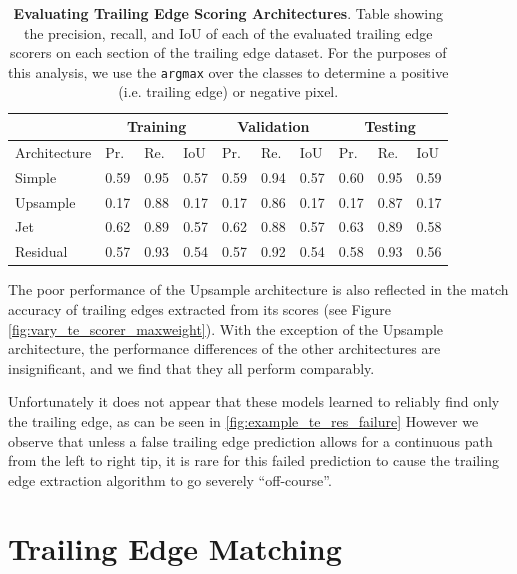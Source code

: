 \begin{table}[!htb]%
\caption{\textbf{Evaluating Trailing Edge Scoring Architectures}. Table showing the precision, recall, and IoU of each of the evaluated trailing edge scorers on each section of the trailing edge dataset. For the purposes of this analysis, we use the \texttt{argmax} over the classes to determine a positive (i.e. trailing edge) or negative pixel.}
	\centering
	\resizebox{\linewidth}{!}
	{
		\begin{tabular} {l || l | l | l || l | l | l || l | l | l |}
		& \multicolumn{3}{c||}{Training} & \multicolumn{3}{c||}{Validation} & \multicolumn{3}{c|}{Testing} \\
		\hline
		Architecture & Pr. & Re. & IoU & Pr. & Re. & IoU & Pr. & Re. & IoU \\
		\hhline{=#===#===#===|}
		Simple & 0.59 & 0.95 & 0.57 & 0.59 & 0.94 & 0.57 & 0.60 & 0.95 & 0.59 \\
		\hline
		Upsample & 0.17 & 0.88 & 0.17 & 0.17 & 0.86 & 0.17 & 0.17 & 0.87 & 0.17 \\
		\hline
		Jet & 0.62 & 0.89 & 0.57 & 0.62 & 0.88 & 0.57 & 0.63 & 0.89 & 0.58 \\
		\hline
		Residual & 0.57 & 0.93 & 0.54 & 0.57 & 0.92 & 0.54 & 0.58 & 0.93 & 0.56 \\
		\hline
		\end{tabular}
	}
	\label{tab:te_score_full_analysis}
\end{table}

The poor performance of the Upsample architecture is also reflected in the match accuracy of trailing edges extracted from its scores (see Figure \ref{fig:vary_te_scorer_maxweight}).
With the exception of the Upsample architecture, the performance differences of the other architectures are insignificant, and we find that they all perform comparably.

Unfortunately it does not appear that these models learned to reliably find only the trailing edge, as can be seen in \ref{fig:example_te_res_failure}
However we observe that unless a false trailing edge prediction allows for a continuous path from the left to right tip, it is rare for this failed prediction to cause the trailing edge extraction algorithm to go severely ``off-course''.

\section{Trailing Edge Matching}

